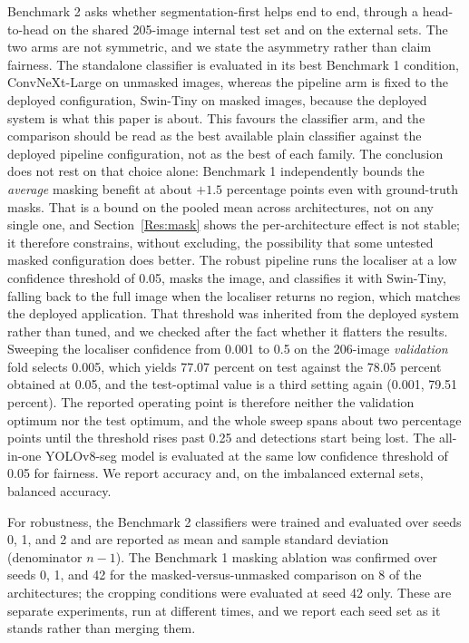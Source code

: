 \documentclass{melba}
\begin{document}
Benchmark 2 asks whether segmentation-first helps end to end, through a head-to-head on the shared 205-image internal test set and on the external sets. The two arms are not symmetric, and we state the asymmetry rather than claim fairness. The standalone classifier is evaluated in its best Benchmark 1 condition, ConvNeXt-Large on unmasked images, whereas the pipeline arm is fixed to the deployed configuration, Swin-Tiny on masked images, because the deployed system is what this paper is about. This favours the classifier arm, and the comparison should be read as the best available plain classifier against the deployed pipeline configuration, not as the best of each family. The conclusion does not rest on that choice alone: Benchmark 1 independently bounds the \emph{average} masking benefit at about $+1.5$ percentage points even with ground-truth masks. That is a bound on the pooled mean across architectures, not on any single one, and Section~\ref{Res:mask} shows the per-architecture effect is not stable; it therefore constrains, without excluding, the possibility that some untested masked configuration does better. The robust pipeline runs the localiser at a low confidence threshold of 0.05, masks the image, and classifies it with Swin-Tiny, falling back to the full image when the localiser returns no region, which matches the deployed application. That threshold was inherited from the deployed system rather than tuned, and we checked after the fact whether it flatters the results. Sweeping the localiser confidence from 0.001 to 0.5 on the 206-image \emph{validation} fold selects 0.005, which yields 77.07 percent on test against the 78.05 percent obtained at 0.05, and the test-optimal value is a third setting again (0.001, 79.51 percent). The reported operating point is therefore neither the validation optimum nor the test optimum, and the whole sweep spans about two percentage points until the threshold rises past 0.25 and detections start being lost. The all-in-one YOLOv8-seg model is evaluated at the same low confidence threshold of 0.05 for fairness. We report accuracy and, on the imbalanced external sets, balanced accuracy.

For robustness, the Benchmark 2 classifiers were trained and evaluated over seeds 0, 1, and 2 and are reported as mean and sample standard deviation (denominator $n-1$). The Benchmark 1 masking ablation was confirmed over seeds 0, 1, and 42 for the masked-versus-unmasked comparison on 8 of the architectures; the cropping conditions were evaluated at seed 42 only. These are separate experiments, run at different times, and we report each seed set as it stands rather than merging them.
\end{document}
